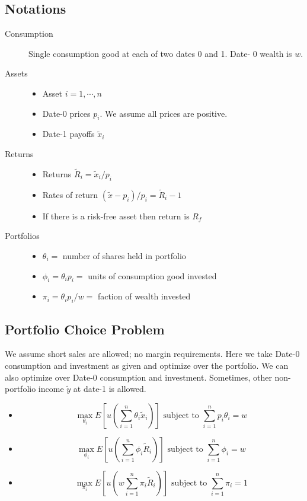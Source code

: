 \documentclass[11pt, a4paper, oneside]{article}
\theoremstyle{definition}
\theoremstyle{proposition}
\theoremstyle{corollary}
\theoremstyle{lemma}
\theoremstyle{theorem}
\begin{document}
\subsection{Notations}
\begin{description}
\item[Consumption] Single consumption good at each of two dates 0 and 1. Date- 0 wealth is $w$. 
\item[Assets] 
\begin{itemize}
\item Asset $i= 1, \cdots, n$
\item Date-0 prices $p_i$. We assume all prices are positive. 
\item Date-1 payoffs $\tilde{x}_i$
\end{itemize}
\item[Returns]
\begin{itemize}
\item Returns $\tilde{R}_i = \tilde{x}_i/p_i$
\item Rates of return $(\tilde{x}-p_i)/p_i = \tilde{R}_i - 1$
\item If there is a risk-free asset then return is $R_f$ 
\end{itemize}
\item[Portfolios]
\begin{itemize}
\item $\theta_i = $ number of shares held in portfolio
\item $\phi_i = \theta_ip_i =$ units of consumption good invested
\item $\pi_i = \theta_i p_i/w=$ faction of wealth invested 
\end{itemize}
\end{description}

\subsection{Portfolio Choice Problem}
We assume short sales are allowed; no margin requirements. Here we take Date-0 consumption and investment as given and optimize over the portfolio. We can also optimize over Date-0 consumption and investment. Sometimes, other non-portfolio income $\tilde{y}$ at date-1 is allowed. 

\begin{itemize}
\item $$\max_{\theta_i} E\left[u\left(\sum_{i=1}^n \theta_i\tilde{x}_i\right)\right]\text{ subject to } \sum_{i=1}^n p_i\theta_i = w$$
\item $$\max_{\phi_i} E\left[u\left(\sum_{i=1}^n \phi_i\tilde{R}_i\right)\right]\text{ subject to } \sum_{i=1}^n \phi_i= w$$
\item $$\max_{\pi_i} E\left[u\left(w\sum_{i=1}^n \pi_i\tilde{R}_i\right)\right]\text{ subject to } \sum_{i=1}^n \pi_i = 1$$
\end{itemize}
\end{document}
